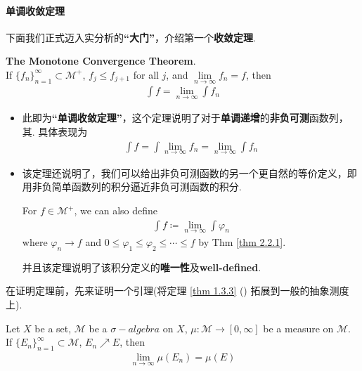 \paragraph{单调收敛定理}
	下面我们正式迈入实分析的\textbf{“大门”}，介绍第一个\textbf{收敛定理}.
	\begin{thm}\label{thm 3.1.2}
		\textbf{The Monotone Convergence Theorem}.\\
		If $\{ f_n \}_{n = 1}^{\infty} \subset \mathcal{M}^{+}$, $f_j \leq f_{j + 1}$ for all $j$, and $\underset{n \to \infty}{\lim}{f_n} = f$, then
		\begin{align}
			\int{f} = \lim_{n \to \infty}{\int{f_n}}
		\end{align}
		
		\vspace{1em}
		\begin{rmk}
			\begin{itemize}
				\item 此即为\textbf{“单调收敛定理”}，这个定理说明了对于\textbf{单调递增}的\textbf{非负可测}函数列，\\
				其. 具体表现为
				\begin{align}
					\int{f} = \int{\lim_{n \to \infty}{f_n}} = \lim_{n \to \infty}{\int{f_n}}
				\end{align}
				
				\vspace{2em}
				\item 该定理还说明了，我们可以给出非负可测函数的另一个更自然的等价定义，即用非负简单函数列的积分逼近非负可测函数的积分.
				\begin{defn}\label{def 3.1.4}
					For $f \in \mathcal{M}^{+}$, we can also define
					\begin{align}
						\int{f} \coloneqq \lim_{n \to \infty}{\int{\varphi_n}}
					\end{align}
					where $\varphi_n \to f$ and $0 \leq \varphi_1 \leq \varphi_2 \leq \cdots \leq f$ by Thm \ref{thm 2.2.1}.
				\end{defn}
				并且该定理说明了该积分定义的\textbf{唯一性}及\textbf{well-defined}.
			\end{itemize}
		\end{rmk}
	
		\newpage
		在证明定理前，先来证明一个引理(将定理 \ref{thm 1.3.3} () 拓展到一般的抽象测度上).
		\begin{lemma}\label{lemma 3.1.3}
			Let $X$ be a set, $\mathcal{M}$ be a $\sigma-algebra$ on $X$, $\mu : \mathcal{M} \longrightarrow [0 , \infty]$ be a measure on $\mathcal{M}$.\\
			If $\{ E_n \}_{n = 1}^{\infty} \subset \mathcal{M}$, $E_n \nearrow E$, then
			\begin{align}
				\lim_{n \to \infty}{\mu(E_n)} = \mu(E)
			\end{align}
		

\end{lemma}
\end{thm}

